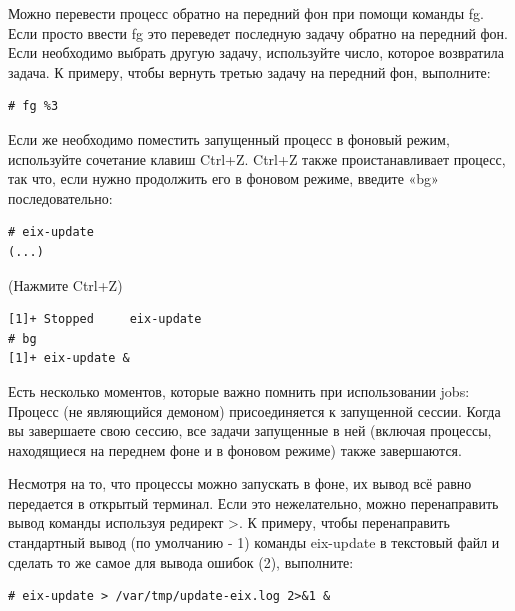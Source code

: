 \documentclass[10pt]{book}
\begin{document}
Можно перевести процесс обратно на передний фон при помощи команды fg. Если просто ввести fg это переведет последную задачу обратно на передний фон. Если необходимо выбрать другую задачу, используйте число, которое возвратила задача. К примеру, чтобы вернуть третью задачу на передний фон, выполните:

\vspace{3mm}
\begin{tcolorbox}
\begin{lstlisting}
# fg %3
\end{lstlisting}
\end{tcolorbox}

Если же необходимо поместить запущенный процесс в фоновый режим, используйте сочетание клавиш Ctrl+Z. Ctrl+Z также проистанавливает процесс, так что, если нужно продолжить его в фоновом режиме, введите «bg» последовательно:

\vspace{3mm}
\begin{tcolorbox}
\begin{lstlisting}
# eix-update
(...)
\end{lstlisting}
\end{tcolorbox}

(Нажмите Ctrl+Z)

\vspace{3mm}
\begin{tcolorbox}
\begin{lstlisting}
[1]+ Stopped	 eix-update
# bg
[1]+ eix-update &
\end{lstlisting}
\end{tcolorbox}

Есть несколько моментов, которые важно помнить при использовании jobs:
Процесс (не являющийся демоном) присоединяется к запущенной сессии. Когда вы завершаете свою сессию, все задачи запущенные в ней (включая процессы, находящиеся на переднем фоне и в фоновом режиме) также завершаются.

Несмотря на то, что процессы можно запускать в фоне, их вывод всё равно передается в открытый терминал. Если это нежелательно, можно перенаправить вывод команды используя редирект >. К примеру, чтобы перенаправить стандартный вывод (по умолчанию - 1) команды eix-update в текстовый файл и сделать то же самое для вывода ошибок (2), выполните:

\vspace{3mm}
\begin{tcolorbox}
\begin{lstlisting}
# eix-update > /var/tmp/update-eix.log 2>&1 &
\end{lstlisting}
\end{tcolorbox}
\end{document}

